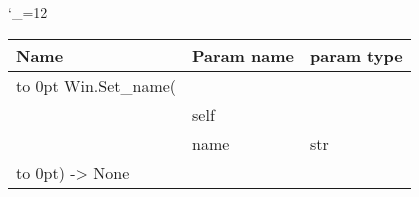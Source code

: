 \begingroup \catcode`\_=12 \tt
\begin{tabular}{lll}
\toprule
\textrm{Name}&\textrm{Param name}&\textrm{param type}\\
\midrule
\hbox to 0pt {Win.Set_name(\hss}\\
& self\\
& name & str\\
\hbox to 0pt{) -> None\hss}\\
\bottomrule
\end{tabular}
\endgroup
